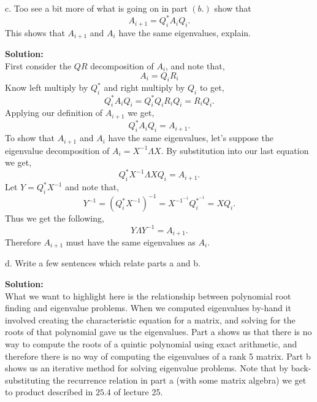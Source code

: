 \documentclass[12pt]{article}
\makeatletter
\theoremstyle{homework}
\newenvironment{exercise}[1]
{\def\@currentlabel{#1}\exercisecore}
{\endexercisecore}
\newcommand{\localhead}[1]{\par\smallskip\noindent\textbf{#1}\nobreak\\}%
\newcommand\solution{\localhead{Solution:}}
\makeatother
\begin{document}
\begin{exercise}{P15}
  \item[c. ] Too see a bit more of what is going on in part $(b.)$ show that 
  \begin{equation*}
    A_{i+1} = Q_i^*A_iQ_i. 
  \end{equation*}  
  This shows that $A_{i+1}$ and $A_i$ have the same eigenvalues, explain.\\
  \solution First consider the $QR$ decomposition of $A_i$, and note that, 
  \begin{equation*}
    A_i = Q_iR_i
  \end{equation*}
  Know left multiply by $Q_i^*$ and right multiply by $Q_i$ to get, 
  \begin{equation*}
    Q_i^*A_iQ_i =  Q_i^*Q_iR_iQ_i  = R_iQ_i. 
  \end{equation*}
  Applying our definition of $A_{i+1}$ we get, 
  \begin{equation*}
    Q_i^*A_iQ_i  = A_{i+1}. 
  \end{equation*}
  To show that $A_{i+1}$ and $A_i$ have the same eigenvalues, let's suppose the eigenvalue 
  decomposition of $A_i = X^{-1} \Lambda X$. By substitution into our last equation we get, 
    \begin{equation*}
      Q_i^*X^{-1} \Lambda XQ_i  = A_{i+1}.  
  \end{equation*}
  Let $Y = Q_i^*X^{-1}$ and note that, 
  \begin{equation*}
    Y^{-1} = (Q_i^*X^{-1})^{-1} = X^{-1^{-1}}Q_i^{*^{-1}} =  XQ_i.
  \end{equation*}
  Thus we get the following, 
  \begin{equation*}
   Y \Lambda Y^{-1} = A_{i+1}.  
  \end{equation*}
  Therefore $A_{i+1}$ must have the same eigenvalues as $A_i$.
  \vspace{.15in}


  \item[d. ] Write a few sentences which relate parts a and b. \\
  \solution What we want to highlight here is the relationship between polynomial root finding 
  and eigenvalue problems. When we computed eigenvalues by-hand it involved creating the characteristic 
  equation for a matrix, and solving for the roots of that polynomial gave us the eigenvalues. Part a shows us that 
  there is no way to compute the roots of a quintic polynomial using exact arithmetic, and therefore there is no way of 
  computing the eigenvalues of a rank 5 matrix. Part b shows us an iterative method for solving eigenvalue problems.
  Note that by back-substituting the recurrence relation in part a (with some matrix algebra) we get to product described in 
  $25.4$ of lecture 25. \\
  
\end{exercise}
\end{document}
